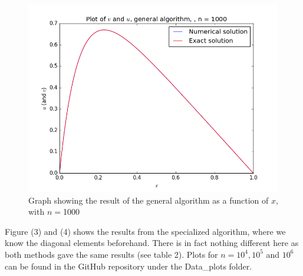 \documentclass[12pt]{article}
\begin{document}
\begin{figure}[hbtp]
\centering
\includegraphics[scale=0.5]{Data_plots/General_data_n1000.png}
\caption{Graph showing the result of the general algorithm  as a function of $x$, with $n=$1000}
\end{figure}

Figure (3) and (4) shows the results from the specialized algorithm, where we know the diagonal elements beforehand. There is in fact nothing different here as both methods gave the same results (see table 2). Plots for $n=10^4, 10^5$ and $10^6$ can be found in the GitHub repository under  the Data\_plots folder.
\end{document}
